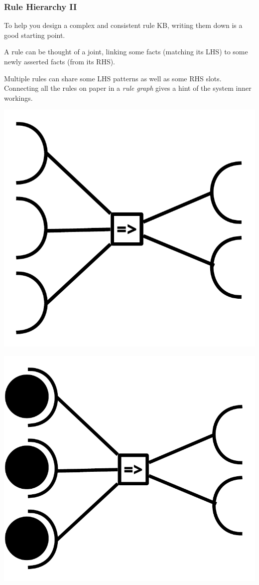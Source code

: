 \documentclass[xcolor={usenames,dvipsnames,svgnames}, compress]{beamer}
\begin{document}
\begin{frame}
  \frametitle{Rule Hierarchy II}
  To help you design a complex and consistent rule KB, writing them
  down is a good starting point.\par
  A rule can be thought of a joint, linking some facts (matching its
  LHS) to some newly asserted facts (from its RHS).\par
  Multiple rules can share some LHS patterns as well as some RHS
  slots. Connecting all the rules on paper in a \emph{rule graph} gives a hint of the system
  inner workings.
  \begin{center}
    \begin{minipage}{0.33\linewidth}
      \centering
      \includegraphics[width=0.7\linewidth]{Figures/rules-I}
    \end{minipage}\begin{minipage}{0.33\linewidth}
      \includegraphics[width=0.7\linewidth]{Figures/rules-II}
    \end{minipage}\begin{minipage}{0.33\linewidth}

\end{minipage}
\end{center}
\end{frame}
\end{document}
